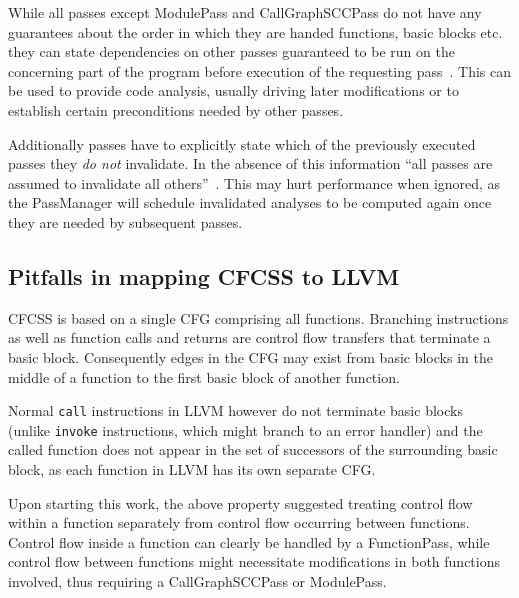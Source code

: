 While all passes except ModulePass and
CallGraphSCCPass do not have any guarantees about the order in which they are
handed functions, basic blocks etc. they can state dependencies on other passes
guaranteed to be run on the concerning part of the program before execution of
the requesting pass~\cite[Specifying interactions between
passes]{writing-passes}. This can be used to provide code analysis, usually
driving later modifications or to establish certain preconditions needed by
other passes.

Additionally passes have to explicitly state which of the previously executed
passes they \emph{do not} invalidate. In the absence of this information “all
passes are assumed to invalidate all others”~\cite[Specifying interactions
between passes]{writing-passes}. This may hurt performance when ignored, as the
PassManager will schedule invalidated analyses to be computed again once they
are needed by subsequent passes.


\subsection{Pitfalls in mapping CFCSS to LLVM}

CFCSS is based on a single CFG comprising all functions. Branching instructions
as well as function calls and returns are control flow transfers that terminate
a basic block. Consequently edges in the CFG may exist from basic blocks in the
middle of a function to the first basic block of another function.

Normal \texttt{call} instructions in LLVM however do not terminate basic
blocks~\cite{langref-terminators} (unlike \texttt{invoke} instructions, which might branch to an
error handler) and the called function does not appear in the set of successors
of the surrounding basic block, as each function in LLVM has its own separate
CFG.

 Upon starting this
work, the above property suggested treating control flow
within a function separately from control flow occurring between functions.
Control flow inside a function can clearly be handled by a FunctionPass, while
control flow between functions might necessitate modifications in both
functions involved, thus requiring a CallGraphSCCPass or ModulePass.
